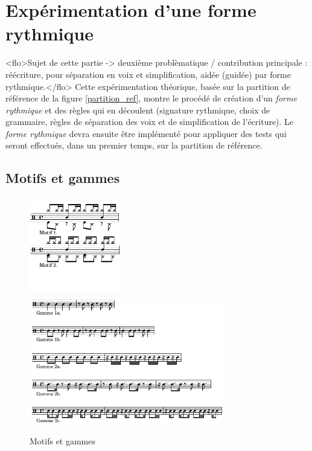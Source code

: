 \section{Expérimentation d’une forme rythmique}
\label{expe_theo}
<flo>Sujet de cette partie -> deuxième problèmatique / contribution
principale : réécriture, pour séparation en voix et simplification, aidée
(guidée) par forme rythmique.</flo>
Cette expérimentation théorique, basée sur la partition de référence de la figure \ref{partition_ref}, 
montre le procédé de création d’un \textit{forme rythmique} et des règles qui en découlent 
(signature rythmique, choix de grammaire, règles de séparation des voix et de simplification de l’écriture). 
Le \textit{forme rythmique} devra ensuite être implémenté pour appliquer des tests qui seront effectués, 
dans un premier temps, sur la partition de référence.

\subsection*{Motifs et gammes}
\begin{figure}[h]
	\centering
	\includegraphics[height=43mm, width=40mm]{z_images/4_experimentations/2_experimentation_theorique/0_motifs_4-4_binaires.png}
	\includegraphics[height=55mm, width=85mm]{z_images/4_experimentations/2_experimentation_theorique/1_gammes_4-4_binaires.png}
	\caption{Motifs et gammes}
	\label{motifs_gammes}
\end{figure}

